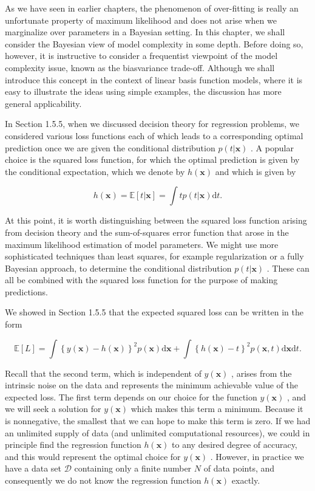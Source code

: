 \documentclass[
  10
]{article}
\begin{document}
As we have seen in earlier chapters, the phenomenon of over-fitting is
really an unfortunate property of maximum likelihood and does not arise
when we marginalize over parameters in a Bayesian setting. In this
chapter, we shall consider the Bayesian view of model complexity in some
depth. Before doing so, however, it is instructive to consider a
frequentist viewpoint of the model complexity issue, known as the
biasvariance trade-off. Although we shall introduce this concept in the
context of linear basis function models, where it is easy to illustrate
the ideas using simple examples, the discussion has more general
applicability.

In Section 1.5.5, when we discussed decision theory for regression
problems, we considered various loss functions each of which leads to a
corresponding optimal prediction once we are given the conditional
distribution \(p ( t | \mathbf { x } )\) . A popular choice is the
squared loss function, for which the optimal prediction is given by the
conditional expectation, which we denote by \(h ( \mathbf { x } )\) and
which is given by

\[
h (\mathbf {x}) = \mathbb {E} [ t | \mathbf {x} ] = \int t p (t | \mathbf {x}) \mathrm{d} t.\tag{3.36}
\]

At this point, it is worth distinguishing between the squared loss
function arising from decision theory and the sum-of-squares error
function that arose in the maximum likelihood estimation of model
parameters. We might use more sophisticated techniques than least
squares, for example regularization or a fully Bayesian approach, to
determine the conditional distribution \(p ( t | \mathbf { x } )\) .
These can all be combined with the squared loss function for the purpose
of making predictions.

We showed in Section 1.5.5 that the expected squared loss can be written
in the form

\[
\mathbb {E} [ L ] = \int \left\{y (\mathbf {x}) - h (\mathbf {x}) \right\} ^ {2} p (\mathbf {x}) \mathrm{d} \mathbf {x} + \int \left\{h (\mathbf {x}) - t \right\} ^ {2} p (\mathbf {x}, t) \mathrm{d} \mathbf {x} \mathrm{d} t.\tag{3.37}
\]

Recall that the second term, which is independent of \(y ( \mathbf x )\)
, arises from the intrinsic noise on the data and represents the minimum
achievable value of the expected loss. The first term depends on our
choice for the function \(y ( \mathbf x )\) , and we will seek a
solution for \(y ( \mathbf x )\) which makes this term a minimum.
Because it is nonnegative, the smallest that we can hope to make this
term is zero. If we had an unlimited supply of data (and unlimited
computational resources), we could in principle find the regression
function \(h ( \mathbf { x } )\) to any desired degree of accuracy, and
this would represent the optimal choice for \(y ( \mathbf x )\) .
However, in practice we have a data set \(\mathcal { D }\) containing
only a finite number \(N\) of data points, and consequently we do not
know the regression function \(h ( \mathbf { x } )\) exactly.
\end{document}
